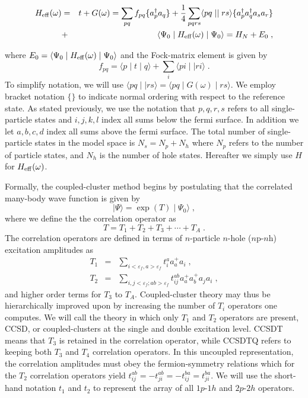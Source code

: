 \begin{eqnarray}
H_{\rm eff}(\omega) &=& t+G(\omega) =\sum_{pq}f_{pq}\{a_p^\dagger a_q\}
+\frac{1}{4}\sum_{pqrs}\langle pq \mid\mid rs \rangle
\{a_p^\dagger a_q^\dagger a_s a_r\}\nonumber \\ 
&+& \langle\Psi_0\mid H_{\rm eff}(\omega)\mid\Psi_0\rangle=H_N+E_0\;,
\end{eqnarray}

where $E_0=\langle\Psi_0\mid H_{\rm eff}(\omega)\mid\Psi_0\rangle$ and
the Fock-matrix element is given by
\begin{equation}
f_{pq}=\langle p\mid t\mid q \rangle +\sum_i \langle pi\mid\mid ri \rangle\;.
\end{equation}
To simplify notation, we will use $\langle pq \mid\mid rs \rangle = 
\langle pq \mid G(\omega)\mid rs \rangle$. 
We employ bracket notation $\{\}$ to indicate normal ordering with respect
to the reference state. As stated previously, we use  the notation that
$p,q,r,s$ refers to  all single-particle states
and $i,j,k,l$ index all sums below the fermi 
surface.  In addition we let 
$a,b,c,d$ index all sums
above the fermi surface.
The total number of single-particle states in the model
space is $N_s = N_p+N_h$ where $N_p$ refers to the number of 
particle states, and $N_h$ is the number of hole states. 
Hereafter we simply use $H$ for $H_{\rm eff}(\omega)$. 

Formally, the coupled-cluster method begins by postulating that 
the correlated many-body wave function is given by 
\begin{equation}
\mid \Psi \rangle = \exp\left(T\right)\mid \Psi_0\rangle  \;,
\end{equation}
where we define the 
the correlation operator as 
\begin{equation}
T=T_1 + T_2 + T_3 + \cdots + T_A \;. 
 \end{equation}
The correlation operators are defined in terms of 
$n$-particle $n$-hole ($n$p-$n$h) excitation amplitudes as 
\begin{eqnarray}
T_1 &=& \sum_{i<\varepsilon_f,a>\varepsilon_f} t^a_i a^+_a a_i\;, \\
T_2 &=& \sum_{i,j<\varepsilon_f; ab > \varepsilon_f}t^{ab}_{ij}
a^+_a a^+_b a_j a_i \;,
\end{eqnarray}
and higher order terms for $T_3$ to $T_A$. 
Coupled-cluster theory may thus be hierarchically  improved upon by 
increasing the number of $T_i$ operators one computes. We will call
the theory in which only $T_1$ and $T_2$ operators are present, CCSD, 
or coupled-clusters at the single and double excitation level. CCSDT 
means that $T_3$ is retained in the correlation operator, while CCSDTQ
refers to keeping both $T_3$ and $T_4$ correlation operators. 
In this uncoupled representation, the correlation amplitudes must 
obey the fermion-symmetry relations which for the 
$T_2$ correlation operators yield $t_{ij}^{ab} = - t_{ji}^{ab} 
= - t_{ij}^{ba} = t_{ji}^{ba}$.  We will use the short-hand notation 
$t_1$ and $t_2$ to represent the 
array of all $1p$-$1h$ and $2p$-$2h$ operators.

